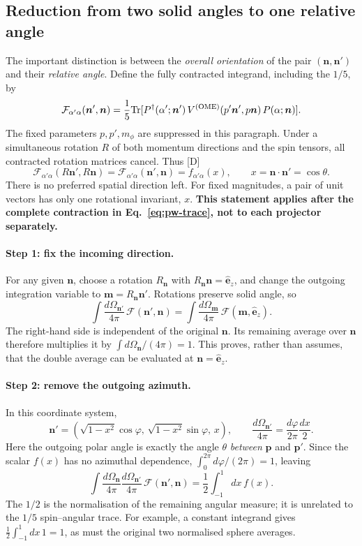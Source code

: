 \documentclass[11pt,a4paper]{article}
\newcommand{\tagD}{\textcolor{orange!85!black}{\textsf{\small[D]}}}
\newcommand{\VOME}{V^{\rm (OME)}}
\newcommand{\vn}{\bm n}
\begin{document}
\subsection{Reduction from two solid angles to one relative angle}

The important distinction is between the \emph{overall orientation} of the pair $(\vn,\vn')$ and their \emph{relative angle}. Define the fully contracted integrand, including the $1/5$, by
\[
\mathcal F_{\alpha'\alpha}(\vn',\vn)
=\frac15{\rm Tr}[P^\dagger(\alpha';\vn')\,
\VOME(p'\vn',p\vn)\,P(\alpha;\vn)].
\]
The fixed parameters $p,p',m_\phi$ are suppressed in this paragraph. Under a simultaneous rotation $R$ of both momentum directions and the spin tensors, all contracted rotation matrices cancel. Thus \tagD
\begin{equation}
\mathcal F_{\alpha'\alpha}(R\vn',R\vn)
=\mathcal F_{\alpha'\alpha}(\vn',\vn)
=f_{\alpha'\alpha}(x),\qquad
x=\vn\cdot\vn'=\cos\theta.
\label{eq:pw-rotation}
\end{equation}
There is no preferred spatial direction left. For fixed magnitudes, a pair of unit vectors has only one rotational invariant, $x$. \textbf{This statement applies after the complete contraction in Eq.~\eqref{eq:pw-trace}, not to each projector separately.}

\paragraph{Step 1: fix the incoming direction.}
For any given $\vn$, choose a rotation $R_{\vn}$ with $R_{\vn}\vn=\hat{\bm e}_z$, and change the outgoing integration variable to $\bm m=R_{\vn}\vn'$. Rotations preserve solid angle, so
\[
\int\frac{d\Omega_{\vn'}}{4\pi}\,
\mathcal F(\vn',\vn)
=\int\frac{d\Omega_{\bm m}}{4\pi}\,
\mathcal F(\bm m,\hat{\bm e}_z).
\]
The right-hand side is independent of the original $\vn$. Its remaining average over $\vn$ therefore multiplies it by
$\int d\Omega_{\vn}/(4\pi)=1$. This proves, rather than assumes, that the double average can be evaluated at $\vn=\hat{\bm e}_z$.

\paragraph{Step 2: remove the outgoing azimuth.}
In this coordinate system,
\[
\vn'=(\sqrt{1-x^2}\cos\varphi,\,
\sqrt{1-x^2}\sin\varphi,\,x),\qquad
\frac{d\Omega_{\vn'}}{4\pi}
=\frac{d\varphi}{2\pi}\frac{dx}{2}.
\]
Here the outgoing polar angle is exactly the angle $\theta$ \emph{between} $\bm p$ and $\bm p'$. Since the scalar $f(x)$ has no azimuthal dependence, $\int_0^{2\pi}d\varphi/(2\pi)=1$, leaving
\begin{equation}
\boxed{\displaystyle
\int\frac{d\Omega_{\vn}}{4\pi}
\frac{d\Omega_{\vn'}}{4\pi}\,
\mathcal F(\vn',\vn)
=\frac12\int_{-1}^{1}dx\,f(x).}
\label{eq:pw-one-angle}
\end{equation}
The $1/2$ is the normalisation of the remaining angular measure; it is unrelated to the $1/5$ spin--angular trace. For example, a constant integrand gives $\frac12\int_{-1}^{1}dx\,1=1$, as must the original two normalised sphere averages.
\end{document}
